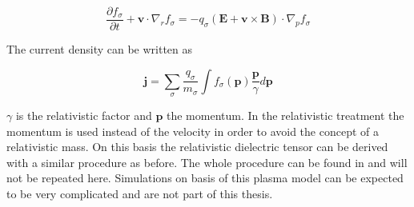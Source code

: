 \documentclass[a4paper,11pt]{thesis}
\begin{document}
\begin{equation}\label{eq:vlasov_linearized_B}
\frac{\partial f_\sigma}{\partial t} + \mathbf{v}\cdot
\nabla_r f_\sigma=-q_\sigma \left( \mathbf{E} + \mathbf{v} \times \mathbf{B}\right) \cdot\nabla_p f_\sigma
\end{equation}

The current density can be written as

\begin{equation}
 \mathbf{j}=\sum_\sigma \frac{q_\sigma}{m_\sigma} \int f_\sigma(\mathbf{p})\frac{\mathbf{p}}{\gamma}d\mathbf{p}
\end{equation}

$\gamma$ is the relativistic factor and $\mathbf{p}$ the momentum. In the relativistic treatment the momentum is used instead of the velocity in order to avoid the concept of a relativistic mass. On this basis the relativistic dielectric tensor can be derived with a similar procedure as before. The whole procedure can be found in \cite{brambilla} and will not be repeated here. Simulations on basis of this plasma model can be expected to be very complicated and are not part of this thesis.




\end{document}
